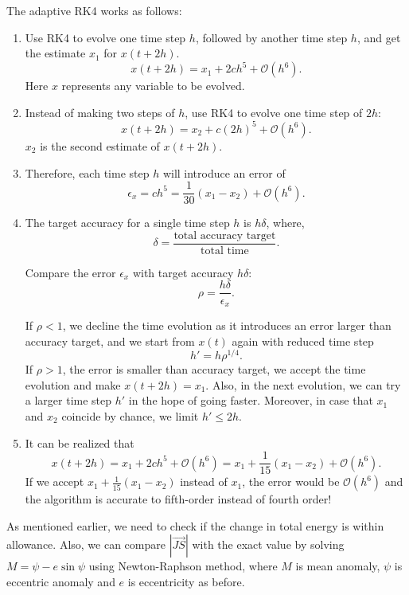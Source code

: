 \documentclass[12pt,a4paper]{article}
\begin{document}
The adaptive RK4 works as follows:

\begin{enumerate}
	\item Use RK4 to evolve one time step $h$, followed by another time step $h$, and get the estimate $x_1$ for $x(t+2h)$.
	\[ x(t+2h) = x_1 + 2ch^5 + \mathcal{O}(h^6). \]
	Here $x$ represents any variable to be evolved.
	
	\item Instead of making two steps of $h$, use RK4 to evolve one time step of $2h$:
	\[ x(t+2h) = x_2 + c{(2h)}^5 + \mathcal{O}(h^6). \]
	$x_2$ is the second estimate of $x(t+2h)$.
	
	\item Therefore, each time step $h$ will introduce an error of 
	\[ \epsilon_x = ch^5  = \frac{1}{30}(x_1-x_2) + \mathcal{O}(h^6). \]
	
	\item The target accuracy for a single time step $h$ is $h \delta$, where,
	\[ \delta = \frac{\textrm{total accuracy target}}{\textrm{total time}}. \]
	
	Compare the error $\epsilon_x$ with target accuracy $h \delta$:
	\[ \rho = \frac{h \delta}{\epsilon_x}.  \]
	
	If $\rho<1$, we decline the time evolution as it introduces an error larger than accuracy target, and we start from $x(t)$ again with reduced time step 
	\[ h' = h {\rho}^{1/4}. \]
	If $\rho>1$, the error is smaller than accuracy target, we accept the time evolution and make $x(t+2h) = x_1$. Also, in the next evolution, we can try a larger time step $h'$ in the hope of going faster. Moreover, in case that $x_1$ and $x_2$ coincide by chance, we limit $h' \leqslant 2h$.
	
	\item It can be realized that
	\[ x(t+2h) = x_1 + 2ch^5 + \mathcal{O}(h^6) = x_1 + \frac{1}{15}(x_1-x_2) + \mathcal{O}(h^6). \]
	If we accept $x_1 + \frac{1}{15}(x_1-x_2)$ instead of $x_1$, the error would be $\mathcal{O}(h^6)$ and the algorithm is accurate to fifth-order instead of fourth order!
	
\end{enumerate}

	
As mentioned earlier, we need to check if the change in total energy is within allowance. Also, we can compare $|\overrightarrow{JS}|$ with the exact value   by solving $M = \psi - e \sin{\psi} $ using Newton-Raphson method, where $M$ is mean anomaly, $\psi$ is eccentric anomaly and $e$ is eccentricity as before.
\end{document}
